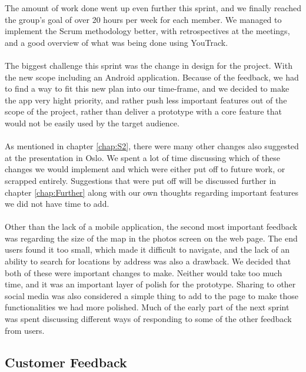 The amount of work done went up even further this sprint, and we finally reached the group's goal of over 20 hours per week for each member. We managed to implement the Scrum methodology better, with retrospectives at the meetings, and a good overview of what was being done using YouTrack.

\paragraph{} The biggest challenge this sprint was the change in design for the project. With the new scope including an Android application. Because of the feedback, we had to find a way to fit this new plan into our time-frame, and we decided to make the app very hight priority, and rather push less important features out of the scope of the project, rather than deliver a prototype with a core feature that would not be easily used by the target audience.

\paragraph{} As mentioned in chapter \ref{chap:S2}, there were many other changes also suggested at the presentation in Oslo. We spent a lot of time discussing which of these changes we would implement and which were either put off to future work, or scrapped entirely. Suggestions that were put off will be discussed further in chapter \ref{chap:Further} along with our own thoughts regarding important features we did not have time to add.

\paragraph{} Other than the lack of a mobile application, the second most important feedback was regarding the size of the map in the photos screen on the web page. The end users found it too small, which made it difficult to navigate, and the lack of an ability to search for locations by address was also a drawback. We decided that both of these were important changes to make. Neither would take too much time, and it was an important layer of polish for the prototype. Sharing to other social media was also considered a simple thing to add to the page to make those functionalities we had more polished. Much of the early part of the next sprint was spent discussing different ways of responding to some of the other feedback from users.

\subsection{Customer Feedback}
\label{subsec:S4RetrospectiveFeedback}

